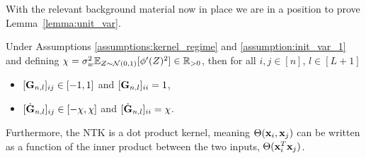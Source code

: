 With the relevant background material now in place we are in a position to prove Lemma~\ref{lemma:unit_var}. 
    
\begin{lemma}\label{lemma:unit_var}
Under Assumptions \ref{assumptions:kernel_regime} and \ref{assumption:init_var_1} and defining $\chi = \sigma_w^2 \mathbb{E}_{Z \sim \mathcal{N}(0,1)}[\phi'(Z)^2] \in \mathbb{R}_{>0}$, then for all $i,j \in [n]$, $l \in [L+1]$
    \begin{itemize}
        \item $[\mathbf{G}_{n,l}]_{ij} \in [-1,1]$ and $[\mathbf{G}_{n,l}]_{ii}=1$,
        \item $[\dot{\mathbf{G}}_{n,l}]_{ij} \in [-\chi,\chi]$ and $[\dot{\mathbf{G}}_{n,l}]_{ii}=\chi$.
    \end{itemize}
    Furthermore, the NTK is a dot product kernel, meaning $\Theta(\mathbf x_i, \mathbf x_j)$ can be written as a function of the inner product between the two inputs, $\Theta(\mathbf x_i^T\mathbf x_j)$.
\end{lemma}
